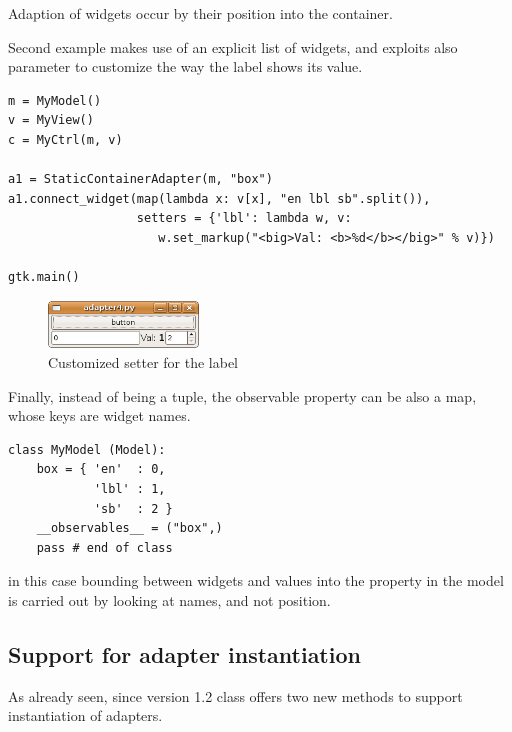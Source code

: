 Adaption of widgets occur by their position into the
 container. 

Second example makes use of an explicit list of widgets, and
exploits also parameter  to customize the way the
label  shows its value.

{ \codesize
\begin{verbatim}
m = MyModel()
v = MyView()
c = MyCtrl(m, v)

a1 = StaticContainerAdapter(m, "box")
a1.connect_widget(map(lambda x: v[x], "en lbl sb".split()), 
                  setters = {'lbl': lambda w, v: 
                     w.set_markup("<big>Val: <b>%d</b></big>" % v)})

gtk.main()
\end{verbatim}
}

\begin{figure}[here]
\begin{center}
\includegraphics[width=4cm]{figs/png/adap3}
\caption{\label{ADAP3_f} Customized setter for the label}
\end{center}
\end{figure}


Finally, instead of being a tuple, the observable property can be
also a map, whose keys are widget names.

{ \codesize
\begin{verbatim}
class MyModel (Model):
    box = { 'en'  : 0,
            'lbl' : 1,
            'sb'  : 2 }
    __observables__ = ("box",)
    pass # end of class
\end{verbatim}
}

in this case bounding between widgets and values into the property
in the model is carried out by looking at names, and not position.


\subsection{Support for adapter instantiation}
As already seen, since version 1.2 class 
offers two new methods to support instantiation of adapters. 

